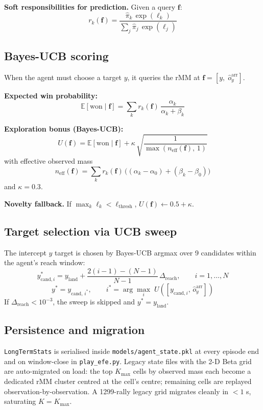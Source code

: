 \documentclass[12pt, a4paper]{article}
\newcommand{\E}{\mathbb{E}}
\newcommand{\1}{\mathbf{1}}
\newcommand{\code}[1]{\texttt{#1}}
\begin{document}
\textbf{Soft responsibilities for prediction.}  Given a query $\mathbf{f}$:
\[
r_k(\mathbf{f})
= \frac{\hat\pi_k\, \exp(\ell_k)}{\sum_j \hat\pi_j\, \exp(\ell_j)}
\]

\subsection{Bayes-UCB scoring}

When the agent must choose a target $y$, it queries the rMM at
$\mathbf{f} = [y,\; \hat o_y^\text{arr}]$.

\textbf{Expected win probability:}
\[
\E[\text{won} \mid \mathbf{f}]
= \sum_k r_k(\mathbf{f})\, \frac{\alpha_k}{\alpha_k + \beta_k}
\]

\textbf{Exploration bonus (Bayes-UCB):}
\[
U(\mathbf{f})
= \E[\text{won}\mid \mathbf{f}]
+ \kappa\, \sqrt{\frac{1}{\max(n_\text{eff}(\mathbf{f}),\, 1)}}
\]
with effective observed mass
\[
n_\text{eff}(\mathbf{f})
= \sum_k r_k(\mathbf{f})\,
  \bigl((\alpha_k - \alpha_0) + (\beta_k - \beta_0)\bigr)
\]
and $\kappa = 0.3$.

\textbf{Novelty fallback.}  If $\max_k \ell_k < \ell_\text{thresh}$,
$U(\mathbf{f}) \leftarrow 0.5 + \kappa$.

\subsection{Target selection via UCB sweep}

The intercept $y$ target is chosen by Bayes-UCB argmax over 9 candidates within
the agent's reach window:
\[
y^*_{\text{cand},i}
= y_\text{land} + \frac{2(i-1) - (N-1)}{N - 1}\,\Delta_\text{reach},
\qquad i = 1, \ldots, N
\]
\[
y^* = y_{\text{cand},\, i^*},
\qquad
i^* = \arg\max_i\; U([y_{\text{cand},i},\, \hat o_y^\text{arr}])
\]
If $\Delta_\text{reach} < 10^{-3}$, the sweep is skipped and $y^* = y_\text{land}$.

\subsection{Persistence and migration}

\code{LongTermStats} is serialised inside \code{models/agent\_state.pkl} at every
episode end and on window-close in \code{play\_efe.py}.  Legacy state files with
the 2-D Beta grid are auto-migrated on load: the top $K_\text{max}$ cells by
observed mass each become a dedicated rMM cluster centred at the cell's centre;
remaining cells are replayed observation-by-observation.  A 1299-rally legacy grid
migrates cleanly in ${<}1$ s, saturating $K = K_\text{max}$.
\end{document}
